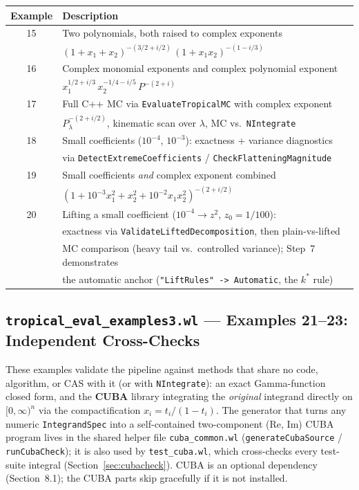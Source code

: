 \documentclass[11pt,a4paper]{article}
\begin{document}
\begin{center}
\begin{tabular}{cl}
\toprule
\textbf{Example} & \textbf{Description} \\
\midrule
15 & Two polynomials, both raised to complex exponents \\
   & $(1{+}x_1{+}x_2)^{-(3/2+i/2)}\,(1{+}x_1 x_2)^{-(1-i/3)}$ \\
16 & Complex monomial exponents and complex polynomial exponent \\
   & $x_1^{1/2+i/3}\, x_2^{-1/4-i/5}\, P^{-(2+i)}$ \\
17 & Full C++ MC via \texttt{EvaluateTropicalMC} with complex exponent \\
   & $P_\lambda^{-(2+i/2)}$, kinematic scan over $\lambda$, MC vs.\ \texttt{NIntegrate} \\
18 & Small coefficients ($10^{-4}$, $10^{-3}$): exactness + variance diagnostics \\
   & via \texttt{DetectExtremeCoefficients} / \texttt{CheckFlatteningMagnitude} \\
19 & Small coefficients \emph{and} complex exponent combined \\
   & $(1 + 10^{-3}x_1^2 + x_2^2 + 10^{-2}x_1 x_2^2)^{-(2+i/2)}$ \\
20 & Lifting a small coefficient ($10^{-4} \to z^2$, $z_0 = 1/100$): \\
   & exactness via \texttt{ValidateLiftedDecomposition}, then plain-vs-lifted \\
   & MC comparison (heavy tail vs.\ controlled variance); Step~7 demonstrates \\
   & the automatic anchor (\texttt{"LiftRules" -> Automatic}, the $k^{*}$ rule) \\
\bottomrule
\end{tabular}
\end{center}

\subsection*{\texttt{tropical\_eval\_examples3.wl} --- Examples 21--23: Independent Cross-Checks}

These examples validate the pipeline against methods that share no code, algorithm, or CAS with it (or with \texttt{NIntegrate}): an exact Gamma-function closed form, and the \textbf{CUBA} library integrating the \emph{original} integrand directly on $[0,\infty)^n$ via the compactification $x_i = t_i/(1-t_i)$. The generator that turns any numeric \texttt{IntegrandSpec} into a self-contained two-component (Re, Im) CUBA program lives in the shared helper file \texttt{cuba\_common.wl} (\texttt{generateCubaSource} / \texttt{runCubaCheck}); it is also used by \texttt{test\_cuba.wl}, which cross-checks every test-suite integral (Section~\ref{sec:cubacheck}). CUBA is an optional dependency (Section~8.1); the CUBA parts skip gracefully if it is not installed.
\end{document}
